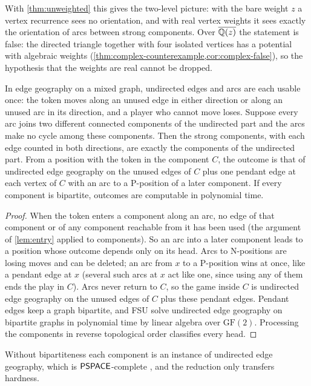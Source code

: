 With \cref{thm:unweighted} this gives the two-level picture: with the bare weight $z$ a vertex recurrence sees no orientation, and with real vertex weights it sees exactly the orientation of arcs between strong components. Over $\overline{\mathbb{Q}(z)}$ the statement is false: the directed triangle together with four isolated vertices has a potential with algebraic weights (\cref{thm:complex-counterexample,cor:complex-false}), so the hypothesis that the weights are real cannot be dropped.

\begin{corollary}\label{cor:edge-geo}
In edge geography on a mixed graph, undirected edges and arcs are each usable once: the token moves along an unused edge in either direction or along an unused arc in its direction, and a player who cannot move loses. Suppose every arc joins two different connected components of the undirected part and the arcs make no cycle among these components. Then the strong components, with each edge counted in both directions, are exactly the components of the undirected part. From a position with the token in the component $C$, the outcome is that of undirected edge geography on the unused edges of $C$ plus one pendant edge at each vertex of $C$ with an arc to a P-position of a later component. If every component is bipartite, outcomes are computable in polynomial time.
\end{corollary}
\begin{proof}
When the token enters a component along an arc, no edge of that component or of any component reachable from it has been used (the argument of \cref{lem:entry} applied to components). So an arc into a later component leads to a position whose outcome depends only on its head. Arcs to N-positions are losing moves and can be deleted; an arc from $x$ to a P-position wins at once, like a pendant edge at $x$ (several such arcs at $x$ act like one, since using any of them ends the play in $C$). Arcs never return to $C$, so the game inside $C$ is undirected edge geography on the unused edges of $C$ plus these pendant edges. Pendant edges keep a graph bipartite, and FSU \cite{FSU} solve undirected edge geography on bipartite graphs in polynomial time by linear algebra over $\mathrm{GF}(2)$. Processing the components in reverse topological order classifies every head.
\end{proof}

Without bipartiteness each component is an instance of undirected edge geography, which is $\mathsf{PSPACE}$-complete \cite{FSU}, and the reduction only transfers hardness.

